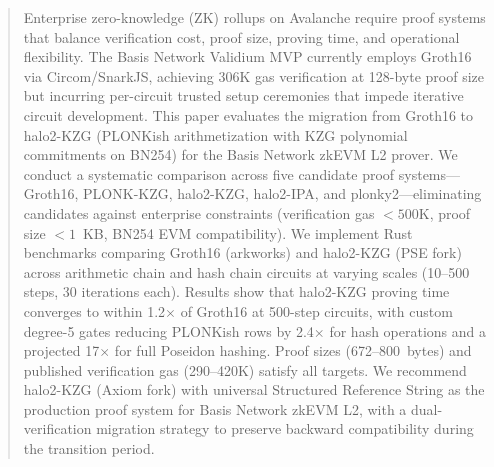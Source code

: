 
\begin{abstract}
Enterprise zero-knowledge (ZK) rollups on Avalanche require proof
systems that balance verification cost, proof size, proving time, and
operational flexibility. The Basis Network Validium MVP currently
employs Groth16 via Circom/SnarkJS, achieving 306K gas verification
at 128-byte proof size but incurring per-circuit trusted setup
ceremonies that impede iterative circuit development. This paper
evaluates the migration from Groth16 to halo2-KZG (PLONKish
arithmetization with KZG polynomial commitments on BN254) for the
Basis Network zkEVM L2 prover. We conduct a systematic comparison
across five candidate proof systems---Groth16, PLONK-KZG, halo2-KZG,
halo2-IPA, and plonky2---eliminating candidates against enterprise
constraints (verification gas $< 500$K, proof size $< 1$~KB, BN254
EVM compatibility). We implement Rust benchmarks comparing Groth16
(arkworks) and halo2-KZG (PSE fork) across arithmetic chain and hash
chain circuits at varying scales (10--500 steps, 30 iterations each).
Results show that halo2-KZG proving time converges to within 1.2$\times$
of Groth16 at 500-step circuits, with custom degree-5 gates reducing
PLONKish rows by 2.4$\times$ for hash operations and a projected
17$\times$ for full Poseidon hashing. Proof sizes (672--800~bytes) and
published verification gas (290--420K) satisfy all targets.
We recommend halo2-KZG (Axiom fork) with universal Structured
Reference String as the production proof system for Basis Network
zkEVM L2, with a dual-verification migration strategy to preserve
backward compatibility during the transition period.
\end{abstract}
